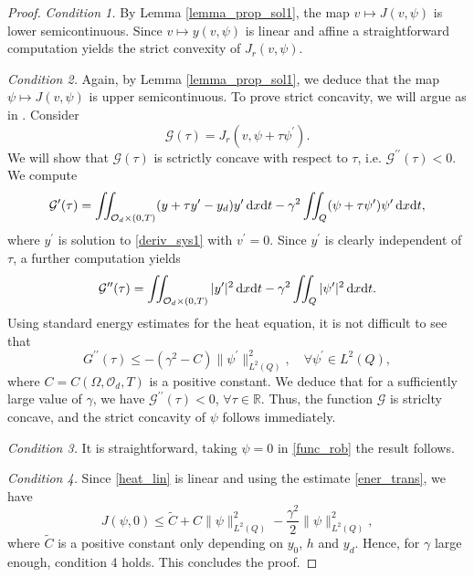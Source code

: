 \documentclass{dcds-bOF}
\theoremstyle{definition}
\def\dx{\,\textnormal{d}x}
\def\dt{\textnormal{d}t}
\begin{document}
\begin{proof}
\textit{Condition 1.} By Lemma \ref{lemma_prop_sol1}, the map $v\mapsto J(v,\psi)$ is lower semicontinuous. Since $v\mapsto y(v,\psi)$ is linear and affine a straightforward computation yields the strict convexity of $J_r(v,\psi)$.

\smallskip\noindent
\textit{Condition 2.} Again, by Lemma \ref{lemma_prop_sol1}, we deduce that the map $\psi\mapsto J(v,\psi)$ is upper semicontinuous. To prove strict concavity, we will argue as in \cite{temam_nonlinear}. Consider
%
\begin{equation*}
\mathcal{G}(\tau)=J_r(v,\psi+\tau \psi^\prime).
\end{equation*}
%
We will show that $\mathcal G(\tau)$ is sctrictly concave with respect to $\tau$, i.e. $\mathcal G^{\prime\prime}(\tau)<0$. We compute
%
\begin{equation*}
\mathcal G^\prime(\tau)=\iint_{\mathcal O_d\times(0,T)}(y+\tau y^\prime-y_d)y^\prime\dx\dt-\gamma^2\iint_{Q}(\psi+\tau\psi^\prime)\psi^\prime\dx\dt,
\end{equation*}
%
where $y^\prime$ is solution to \eqref{deriv_sys1} with $v^\prime=0$. Since $y^\prime$ is clearly independent of $\tau$, a further computation yields
%
\begin{equation*}
\mathcal G^{\prime\prime}(\tau)=\iint_{\mathcal O_d\times(0,T)}|y^\prime|^2\dx\dt-\gamma^2\iint_{Q}|\psi^\prime|^2\dx\dt.
\end{equation*}
%
Using standard energy estimates for the heat equation, it is not difficult to see that
%
\begin{equation*}
G^{\prime\prime}(\tau)\leq -(\gamma^2-C)\|\psi^\prime\|^2_{L^2(Q)}, \quad \forall \psi^\prime\in L^2(Q),
\end{equation*}
%
where $C=C(\Omega,\mathcal O_d,T)$ is a positive constant. We deduce that for a sufficiently large value of $\gamma$, we have $\mathcal G^{\prime\prime}(\tau)<0$, $\forall \tau\in \mathbb{R}$. Thus, the function $\mathcal G$ is striclty concave, and the strict concavity of $\psi$ follows immediately.

\smallskip\noindent
\textit{Condition 3.} It is straightforward, taking $\psi=0$ in \eqref{func_rob} the result follows.

\smallskip\noindent
\textit{Condition 4.} Since \eqref{heat_lin} is linear and using the estimate \eqref{ener_trans}, we have
%
\begin{equation*}
J(\psi,0)\leq \tilde C+C\|\psi\|_{L^2(Q)}^2-\frac{\gamma^2}{2}\|\psi\|_{L^2(Q)}^2,
\end{equation*}
%
where $\tilde C$ is a positive constant only depending on $y_0$, $h$ and $y_d$. Hence, for $\gamma$ large enough, condition 4 holds. This concludes the proof.
%
\end{proof}
\end{document}
